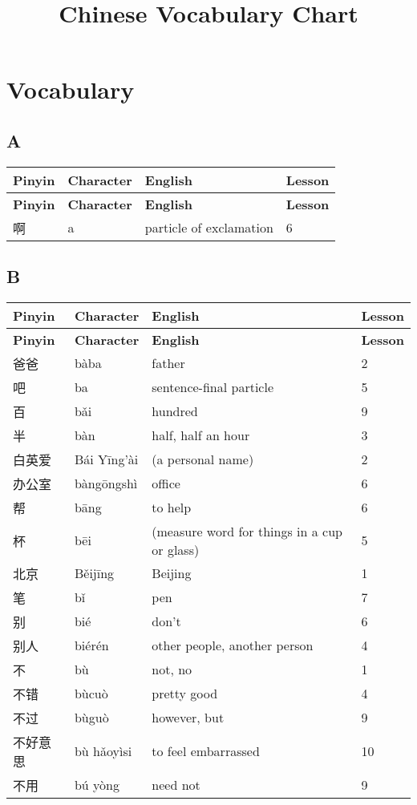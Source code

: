 \documentclass[12pt]{article}
\title{Chinese Vocabulary Chart}
\author{}
\date{}
\newcommand{\vocabitem}[4]{%
  #1 & #2 & #3 & #4 \\ \midrule
}
\begin{document}
\maketitle

\section*{Vocabulary}

\subsection*{A}
\begin{longtable}{P{\dimexpr\textwidth/4\relax}P{\dimexpr\textwidth/4\relax}P{\dimexpr\textwidth/4\relax}P{\dimexpr\textwidth/4\relax}}
\toprule
\textbf{Pinyin} & \textbf{Character} & \textbf{English} & \textbf{Lesson} \\
\midrule
\endfirsthead
\toprule
\textbf{Pinyin} & \textbf{Character} & \textbf{English} & \textbf{Lesson} \\
\midrule
\endhead
\vocabitem{啊}{a}{particle of exclamation}{6}
\bottomrule
\end{longtable}

\subsection*{B}
\begin{longtable}{P{\dimexpr\textwidth/4\relax}P{\dimexpr\textwidth/4\relax}P{\dimexpr\textwidth/4\relax}P{\dimexpr\textwidth/4\relax}}
\toprule
\textbf{Pinyin} & \textbf{Character} & \textbf{English} & \textbf{Lesson} \\
\midrule
\endfirsthead
\toprule
\textbf{Pinyin} & \textbf{Character} & \textbf{English} & \textbf{Lesson} \\
\midrule
\endhead
\vocabitem{爸爸}{bàba}{father}{2}
\vocabitem{吧}{ba}{sentence-final particle}{5}
\vocabitem{百}{bǎi}{hundred}{9}
\vocabitem{半}{bàn}{half, half an hour}{3}
\vocabitem{白英爱}{Bái Yīng'ài}{(a personal name)}{2}
\vocabitem{办公室}{bàngōngshì}{office}{6}
\vocabitem{帮}{bāng}{to help}{6}
\vocabitem{杯}{bēi}{(measure word for things in a cup or glass)}{5}
\vocabitem{北京}{Běijīng}{Beijing}{1}
\vocabitem{笔}{bǐ}{pen}{7}
\vocabitem{别}{bié}{don't}{6}
\vocabitem{别人}{biérén}{other people, another person}{4}
\vocabitem{不}{bù}{not, no}{1}
\vocabitem{不错}{bùcuò}{pretty good}{4}
\vocabitem{不过}{bùguò}{however, but}{9}
\vocabitem{不好意思}{bù hǎoyìsi}{to feel embarrassed}{10}
\vocabitem{不用}{bú yòng}{need not}{9}
\bottomrule
\end{longtable}
\end{document}
